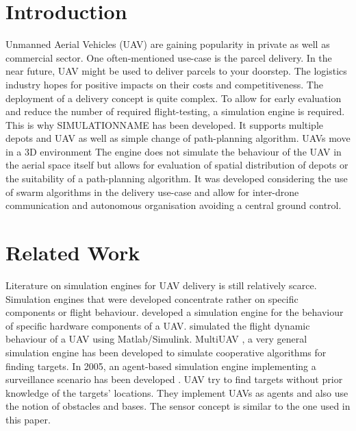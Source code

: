 \section{Introduction}
Unmanned Aerial Vehicles (UAV) are gaining popularity in private as well as commercial sector. One often-mentioned use-case is the parcel delivery. In the near future, UAV might be used to deliver parcels to your doorstep. The logistics industry hopes for positive impacts on their costs and competitiveness. The deployment of a delivery concept is quite complex. To allow for early evaluation and reduce the number of required flight-testing, a simulation engine is required. This is why SIMULATIONNAME has been developed. It supports multiple depots and UAV as well as  simple change of path-planning algorithm. UAVs move in a 3D environment  The engine does not simulate the behaviour of the UAV in the aerial space itself but allows for evaluation of spatial distribution of depots or the suitability of a path-planning algorithm. It was developed considering the use of swarm algorithms in the delivery use-case and allow for inter-drone communication and autonomous organisation avoiding a central ground control.

\section{Related Work}
Literature on simulation engines for UAV delivery is still relatively scarce. Simulation engines that were developed concentrate rather on specific components or flight behaviour.
\cite{johnson.2001} developed a simulation engine for the behaviour of specific hardware components of a UAV. \cite{lu.2011} simulated the flight dynamic behaviour of a UAV using Matlab/Simulink. MultiUAV \cite{rasmussen.2003}, a very general simulation engine has been developed to simulate cooperative algorithms for finding targets. In 2005,  an agent-based simulation engine implementing a surveillance scenario has been developed \cite{jang.2005}. UAV try to find targets without prior knowledge of the targets’ locations. They implement UAVs as agents and also use the notion of obstacles and bases. The sensor concept is similar to the one used in this paper.


